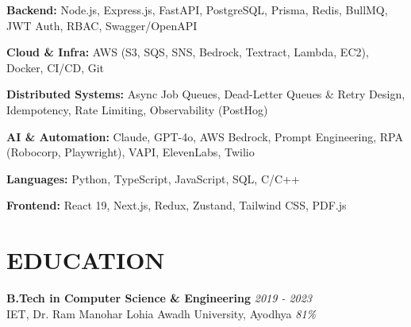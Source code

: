 \documentclass[a4paper,10pt]{article}
\begin{document}
\textbf{Backend:} Node.js, Express.js, FastAPI, PostgreSQL, Prisma, Redis, BullMQ, JWT Auth, RBAC, Swagger/OpenAPI

\textbf{Cloud \& Infra:} AWS (S3, SQS, SNS, Bedrock, Textract, Lambda, EC2), Docker, CI/CD, Git

\textbf{Distributed Systems:} Async Job Queues, Dead-Letter Queues \& Retry Design, Idempotency, Rate Limiting, Observability (PostHog)

\textbf{AI \& Automation:} Claude, GPT-4o, AWS Bedrock, Prompt Engineering, RPA (Robocorp, Playwright), VAPI, ElevenLabs, Twilio

\textbf{Languages:} Python, TypeScript, JavaScript, SQL, C/C++

\textbf{Frontend:} React 19, Next.js, Redux, Zustand, Tailwind CSS, PDF.js

\vspace{3pt}

\section{EDUCATION}

\textbf{B.Tech in Computer Science \& Engineering} \hfill \textit{2019 - 2023}\\
IET, Dr. Ram Manohar Lohia Awadh University, Ayodhya \hfill \textit{81\%}
\end{document}

